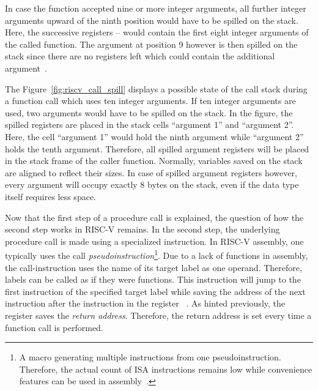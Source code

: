 In case the function accepted nine or more integer arguments,
all further integer arguments upward of the ninth position would have to be spilled on the stack.
Here, the successive registers -- would contain the first eight integer arguments of the called function.
The argument at position 9 however is then spilled on the stack since there are no registers left which could contain the additional argument~\cite[p.~8]{RiscvABI2022}.

The Figure~\ref{fig:riscv_call_spill} displays a possible state of the call stack during a function call which uses ten integer arguments.
If ten integer arguments are used, two arguments would have to be spilled on the stack.
In the figure, the spilled registers are placed in the stack cells \enquote{argument 1} and \enquote{argument 2}.
Here, the cell \enquote{argument 1} would hold the ninth argument while \enquote{argument 2} holds the tenth argument.
Therefore, all spilled argument registers will be placed in the stack frame of the caller function.
Normally, variables saved on the stack are aligned to reflect their sizes.
In case of spilled argument registers however, every argument will occupy exactly 8 bytes on the stack, even if the data type itself requires less space.

Now that the first step of a procedure call is explained, the question of how the second step works in RISC-V remains.
In the second step, the underlying procedure call is made using a specialized instruction.
In RISC-V assembly, one typically uses the call \emph{pseudoinstruction}\footnote{A macro generating multiple instructions from one pseudoinstruction. Therefore, the actual count of ISA instructions remains low while convenience features can be used in assembly~\cite[p.~68]{Dandamudi2005}.}.
Due to a lack of functions in assembly, the call-instruction uses the name of its target label as one operand.
Therefore, labels can be called as if they were functions.
This instruction will jump to the first instruction of the specified target label while saving the address of the next instruction after the  instruction in the register ~\cite[p.~22]{Patterson2017}.
As hinted previously, the  register saves the \emph{return address}.
Therefore, the return address is set every time a function call is performed.

